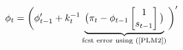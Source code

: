 \documentclass[11pt]{article}
\renewcommand{\[}{\begin{equation}}
\renewcommand{\]}{\end{equation}}
\DeclareMathOperator{\E}{\mathbb{E}}
\newcommand\numberthis{\addtocounter{equation}{1}\tag{\theequation}} %
\begin{document}
\begin{equation}
\phi_{t} = \bigg( \phi_{t-1}' +k_t^{-1}\underbrace{\big(\pi_{t} - \phi_{t-1}\begin{bmatrix} 1 \\ s_{t-1} \end{bmatrix}
 \big)}_{\text{fcst error using (\ref{PLM2})} }  \bigg)'
\end{equation}


\newpage
\end{document}
